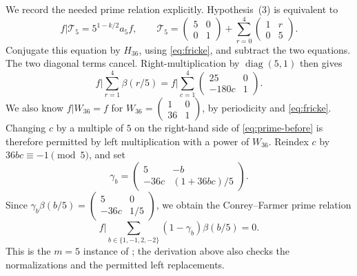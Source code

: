 \documentclass[11pt]{article}
\theoremstyle{remark}
\newcommand{\bb}{\beta}
\begin{document}
We record the needed prime relation explicitly.  Hypothesis~(3) is
equivalent to
\[
 f|\mathcal T_5=5^{1-k/2}a_5f,\qquad
 \mathcal T_5=
 \begin{pmatrix}5&0\\0&1\end{pmatrix}
 +\sum_{r=0}^4\begin{pmatrix}1&r\\0&5\end{pmatrix}.
\]
Conjugate this equation by $H_{36}$, using \eqref{eq:fricke}, and subtract
the two equations.  The two diagonal terms cancel.  Right-multiplication
by $\operatorname{diag}(5,1)$ then gives
\begin{equation}\label{eq:prime-before}
 f\bigg|\sum_{r=1}^4\bb(r/5)
 =f\bigg|\sum_{c=1}^4\begin{pmatrix}25&0\\-180c&1\end{pmatrix}.
\end{equation}
We also know $f|W_{36}=f$ for
$W_{36}=\begin{pmatrix}1&0\\36&1\end{pmatrix}$, by periodicity and
\eqref{eq:fricke}.  Changing $c$ by a multiple of $5$ on the right-hand
side of \eqref{eq:prime-before} is therefore permitted by left
multiplication with a power of $W_{36}$.  Reindex $c$ by
$36bc\equiv-1\pmod5$, and set
\[
 \gamma_b=\begin{pmatrix}5&-b\\-36c&(1+36bc)/5\end{pmatrix}.
\]
Since
$\gamma_b\bb(b/5)=\begin{pmatrix}5&0\\-36c&1/5\end{pmatrix}$,
we obtain the Conrey--Farmer prime relation
\begin{equation}\label{eq:prime}
 f\bigg|\sum_{b\in\{1,-1,2,-2\}}(1-\gamma_b)\bb(b/5)=0.
\end{equation}
This is the $m=5$ instance of \cite[Corollary~2]{CF}; the derivation above
also checks the normalizations and the permitted left replacements.
\end{document}
